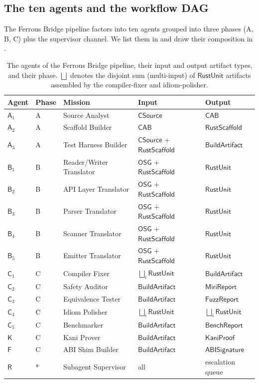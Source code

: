\documentclass[12pt]{article}
\theoremstyle{definition}
\theoremstyle{remark}
\newcommand{\Agent}[1]{\ensuremath{\mathsf{#1}}}
\newcommand{\Artifact}[1]{\ensuremath{\mathsf{#1}}}
\newcommand{\CSrc}{\Artifact{CSource}}
\newcommand{\CAB}{\Artifact{CAB}}
\newcommand{\OSG}{\Artifact{OSG}}
\newcommand{\Scaff}{\Artifact{RustScaffold}}
\newcommand{\RUnit}{\Artifact{RustUnit}}
\newcommand{\BArt}{\Artifact{BuildArtifact}}
\newcommand{\MiriR}{\Artifact{MiriReport}}
\newcommand{\FuzzR}{\Artifact{FuzzReport}}
\newcommand{\KaniP}{\Artifact{KaniProof}}
\newcommand{\ABISig}{\Artifact{ABISignature}}
\newcommand{\BenchR}{\Artifact{BenchReport}}
\begin{document}
\subsection{The ten agents and the workflow DAG}
\label{sec:ten-agents}

The Ferrous Bridge pipeline factors into ten agents grouped into three
phases (A, B, C) plus the supervisor channel. We list them in
 and draw their composition in .

\begin{table}[h]
\centering
\small
\begin{tabular}{|l|l|l|l|l|}
\hline
\textbf{Agent} & \textbf{Phase} & \textbf{Mission} & \textbf{Input} & \textbf{Output}\\
\hline
\(\Agent{A}_1\) & A & Source Analyst & \CSrc & \CAB\\
\(\Agent{A}_2\) & A & Scaffold Builder & \CAB & \Scaff\\
\(\Agent{A}_3\) & A & Test Harness Builder & \CSrc{} + \Scaff & \BArt\\
\(\Agent{B}_1\) & B & Reader/Writer Translator & \OSG{} + \Scaff & \RUnit\\
\(\Agent{B}_2\) & B & API Layer Translator & \OSG{} + \Scaff & \RUnit\\
\(\Agent{B}_3\) & B & Parser Translator & \OSG{} + \Scaff & \RUnit\\
\(\Agent{B}_4\) & B & Scanner Translator & \OSG{} + \Scaff & \RUnit\\
\(\Agent{B}_5\) & B & Emitter Translator & \OSG{} + \Scaff & \RUnit\\
\(\Agent{C}_1\) & C & Compiler Fixer & \(\bigsqcup_i \RUnit\) & \BArt\\
\(\Agent{C}_2\) & C & Safety Auditor & \BArt & \MiriR\\
\(\Agent{C}_3\) & C & Equivalence Tester & \BArt & \FuzzR\\
\(\Agent{C}_4\) & C & Idiom Polisher & \(\bigsqcup_i \RUnit\) & \(\bigsqcup_i \RUnit\)\\
\(\Agent{C}_5\) & C & Benchmarker & \BArt & \BenchR\\
\(\Agent{K}\)   & C & Kani Prover & \BArt & \KaniP\\
\(\Agent{F}\)   & C & ABI Shim Builder & \BArt & \ABISig\\
\(\Agent{R}\)   & * & Subagent Supervisor & all & escalation queue\\
\hline
\end{tabular}
\caption{The agents of the Ferrous Bridge pipeline, their input and
output artifact types, and their phase. \(\bigsqcup\) denotes the
disjoint sum (multi-input) of \RUnit{} artifacts assembled by the
compiler-fixer and idiom-polisher.}
\label{tab:agents}
\end{table}
\end{document}

